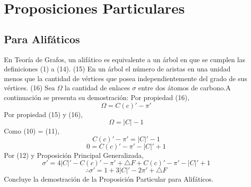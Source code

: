 \documentclass{article}
\begin{document}
\section{Proposiciones Particulares}
\subsection{Para Alifáticos}
\newtheorem{myteo6}{Teorema} 
\begin{center} 
\end{center}


En Teoría de Grafos, un alifático es equivalente a un árbol en que se cumplen las definiciones (1) a (14).\newline
(15) En un árbol el número de aristas en una unidad menos que la cantidad de vértices que posea independientemente del grado de sus vértices.\newline
(16) Sea $\Omega$ la cantidad de enlaces $\sigma$ entre dos átomos de carbono.\newline \newline A continuación se presenta su demostración:\newline \newline
Por propiedad (16),
\begin{equation}
\Omega=C(c)'-\pi'
\end{equation}\newline
Por propiedad (15) y (16),
\begin{equation}
\Omega=|C|-1
\end{equation}
Como (10) = (11),
$$C(c)'-\pi'=|C|'-1$$
\begin{equation}
0=C(c)'-\pi'-|C|'+1
\end{equation}
Por (12) y Proposición Principal Generalizada,
$$\sigma'=4|C|'-C(c)'-\pi'+\bigtriangleup F+C(c)'-\pi'-|C|'+1$$
\begin{equation}
\therefore\sigma'=1+3|C|'-2\pi'+\bigtriangleup F
\end{equation}\newline
Concluye la demostración de la Proposición Particular para Alifáticos.
\end{document}
